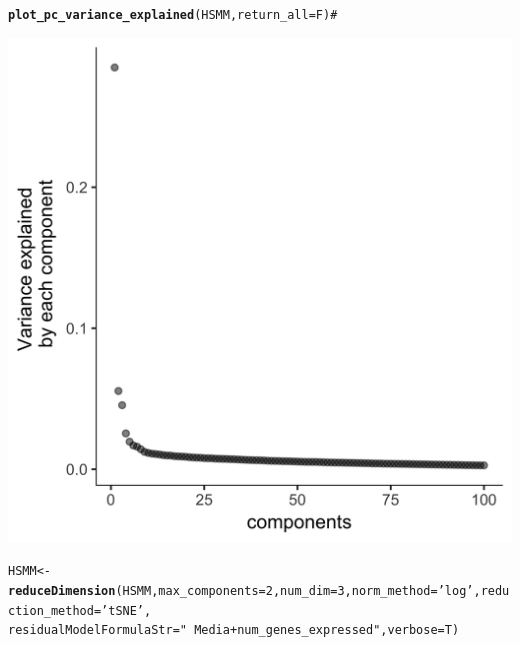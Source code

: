 \documentclass[10pt,oneside]{article}\usepackage[]{graphicx}\usepackage[]{color}
\makeatletter
\def\maxwidth{ %
  \ifdim\Gin@nat@width>\linewidth
    \linewidth
  \else
    \Gin@nat@width
  \fi
}
\newcommand{\hlnum}[1]{\textcolor[rgb]{0.686,0.059,0.569}{#1}}%
\newcommand{\hlstr}[1]{\textcolor[rgb]{0.192,0.494,0.8}{#1}}%
\newcommand{\hlcom}[1]{\textcolor[rgb]{0.678,0.584,0.686}{\textit{#1}}}%
\newcommand{\hlstd}[1]{\textcolor[rgb]{0.345,0.345,0.345}{#1}}%
\newcommand{\hlkwb}[1]{\textcolor[rgb]{0.69,0.353,0.396}{#1}}%
\newcommand{\hlkwc}[1]{\textcolor[rgb]{0.333,0.667,0.333}{#1}}%
\newcommand{\hlkwd}[1]{\textcolor[rgb]{0.737,0.353,0.396}{\textbf{#1}}}%
\newenvironment{kframe}{%
 \def\at@end@of@kframe{}%
 \ifinner\ifhmode%
  \def\at@end@of@kframe{\end{minipage}}%
  \begin{minipage}{\columnwidth}%
 \fi\fi%
 \def\FrameCommand##1{\hskip\@totalleftmargin \hskip-\fboxsep
 \colorbox{shadecolor}{##1}\hskip-\fboxsep
     \hskip-\linewidth \hskip-\@totalleftmargin \hskip\columnwidth}%
 \MakeFramed {\advance\hsize-\width
   \@totalleftmargin\z@ \linewidth\hsize
   \@setminipage}}%
 {\par\unskip\endMakeFramed%
 \at@end@of@kframe}
\newenvironment{knitrout}{}{} %
\makeatother
\begin{document}
\begin{knitrout}
\color{fgcolor}\begin{kframe}
\begin{alltt}
\hlkwd{plot_pc_variance_explained}\hlstd{(HSMM,} \hlkwc{return_all} \hlstd{= F)} \hlcom{# }
\end{alltt}
\end{kframe}

{\centering \includegraphics[width=\maxwidth]{figure/cluster_cells_semisup_clustering_no_impute-1} 

}


\begin{kframe}\begin{alltt}
\hlstd{HSMM} \hlkwb{<-} \hlkwd{reduceDimension}\hlstd{(HSMM,} \hlkwc{max_components}\hlstd{=}\hlnum{2}\hlstd{,} \hlkwc{num_dim} \hlstd{=} \hlnum{3}\hlstd{,} \hlkwc{norm_method} \hlstd{=} \hlstr{'log'}\hlstd{,} \hlkwc{reduction_method} \hlstd{=} \hlstr{'tSNE'}\hlstd{,}
                       \hlkwc{residualModelFormulaStr}\hlstd{=}\hlstr{"~Media + num_genes_expressed"}\hlstd{,} \hlkwc{verbose} \hlstd{= T)}
\end{alltt}


{\ttfamily\noindent\itshape\color{messagecolor}{\#\# Removing batch effects}}


\end{kframe}
\end{knitrout}
\end{document}
